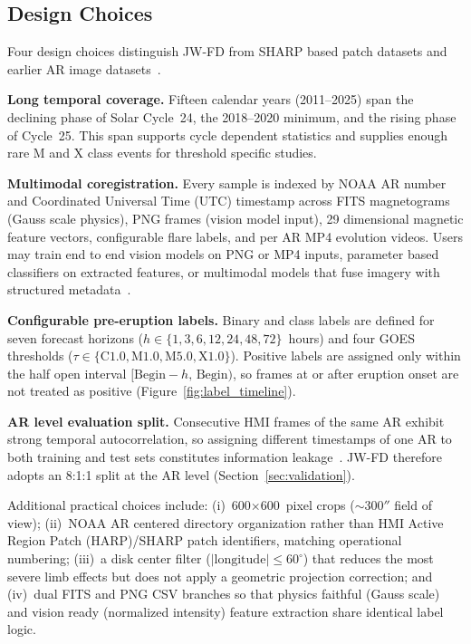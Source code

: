 \documentclass[universe,article,submit,moreauthors]{Definitions/mdpi}
\newif\ifrevision
\newcommand{\add}[1]{\ifrevision\textcolor{blue}{#1}\else#1\fi}
\newcommand{\del}[1]{\ifrevision\textcolor{red}{\sout{#1}}\else\fi}
\begin{document}
\subsection{Design Choices}
\label{sec:design}

Four design choices distinguish JW-FD from SHARP based patch datasets and earlier AR image datasets~\cite{Boucheron2023,Bobra2014}.

\textbf{Long temporal coverage.} Fifteen calendar years (2011--2025) span the declining phase of Solar Cycle~24, the 2018--2020 minimum, and the rising phase of Cycle~25. This span supports cycle dependent statistics and supplies enough rare M and X class events for threshold specific studies.

\textbf{Multimodal coregistration.} Every sample is indexed by NOAA AR number and Coordinated Universal Time (UTC) timestamp across FITS magnetograms (Gauss scale physics), PNG frames (vision model input), 29 dimensional magnetic feature vectors, configurable flare labels, and per AR MP4 evolution videos. Users may train end to end vision models on PNG or MP4 inputs, parameter based classifiers on extracted features, or multimodal models that fuse imagery with structured metadata~\cite{Shao2025jwflare}.

\textbf{Configurable pre-eruption labels.} Binary and class labels are defined for seven forecast horizons ($h \in \{1,3,6,12,24,48,72\}$~hours) and four GOES thresholds ($\tau \in \{\mathrm{C1.0,M1.0,M5.0,X1.0}\}$). Positive labels are assigned only within the half open interval $[\mathrm{Begin}-h,\,\mathrm{Begin})$, so frames at or after eruption onset are not treated as positive (Figure~\ref{fig:label_timeline}).

\textbf{AR level evaluation split.} Consecutive HMI frames of the same AR exhibit strong temporal autocorrelation, so assigning different timestamps of one AR to both training and test sets constitutes information leakage~\cite{Barnes2016,Leka2019}. JW-FD therefore adopts an 8:1:1 split at the AR level (Section~\ref{sec:validation})\del{; a subsequent 19-AR adjustment balances rare-class positives between validation and test}.

Additional practical choices include: (i)~600$\times$600~pixel crops ($\sim$300$''$ field of view); (ii)~NOAA AR centered directory organization rather than HMI Active Region Patch (HARP)/SHARP patch identifiers, matching operational numbering; (iii)~a disk center filter ($|\mathrm{longitude}| \le 60^\circ$) that reduces the most severe limb effects but does not apply a geometric projection correction; and (iv)~dual FITS and PNG CSV branches so that physics faithful (Gauss scale) and vision ready (normalized intensity) feature extraction share identical label logic.
\end{document}
